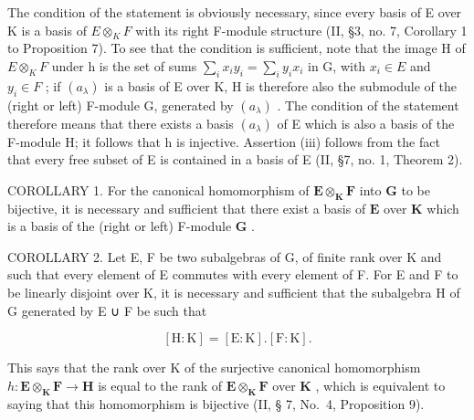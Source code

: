 The condition of the statement is obviously necessary, since every basis of E over K is a basis of \(E \otimes_{K} F\) with its right F-module structure (II, §3, no. 7, Corollary 1 to Proposition 7). To see that the condition is sufficient, note that the image H of \(E \otimes_{K} F\) under h is the set of sums \(\sum_{i} x_{i} y_{i} = \sum_{i} y_{i} x_{i}\) in G, with \(x_{i} \in E\) and \(y_{i} \in F\) ; if \((a_{\lambda})\) is a basis of E over K, H is therefore also the submodule of the (right or left) F-module G, generated by \((a_{\lambda})\) . The condition of the statement therefore means that there exists a basis \((a_{\lambda})\) of E which is also a basis of the F-module H; it follows that h is injective. Assertion (iii) follows from the fact that every free subset of E is contained in a basis of E (II, §7, no. 1, Theorem 2).

COROLLARY 1. For the canonical homomorphism of \(\mathbf{E} \otimes_{\mathbf{K}} \mathbf{F}\) into \(\mathbf{G}\) to be bijective, it is necessary and sufficient that there exist a basis of \(\mathbf{E}\) over \(\mathbf{K}\) which is a basis of the (right or left) F-module \(\mathbf{G}\) .

COROLLARY 2. Let E, F be two subalgebras of G, of finite rank over K and such that every element of E commutes with every element of F. For E and F to be linearly disjoint over K, it is necessary and sufficient that the subalgebra H of G generated by E ∪ F be such that

\[
[ \mathrm{H}: \mathrm{K} ] = [ \mathrm{E}: \mathrm{K} ]. [ \mathrm{F}: \mathrm{K} ].\tag{12}
\]

This says that the rank over K of the surjective canonical homomorphism \(h: \mathbf{E} \otimes_{\mathbf{K}} \mathbf{F} \to \mathbf{H}\) is equal to the rank of \(\mathbf{E} \otimes_{\mathbf{K}} \mathbf{F}\) over \(\mathbf{K}\) , which is equivalent to saying that this homomorphism is bijective (II, § 7, No.~4, Proposition 9).

